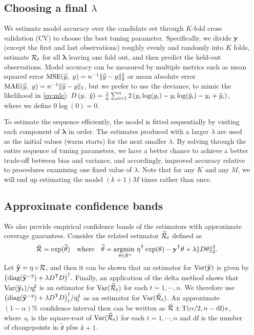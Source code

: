 \subsection{Choosing a final $\lambda$}
\label{sec:cv}

We estimate model accuracy over the candidate set through $K$-fold cross
validation (CV) to choose the best tuning parameter. Specifically, we divide
$\mathbf{y}$ (except the first and last observations) roughly evenly and randomly into
$K$ folds, estimate $\mathcal{R}_t$ for all $\boldsymbol{\lambda}$ leaving one fold
out, and then predict the held-out observations. Model accuracy can be measured
by multiple metrics such as mean squared error $\mathrm{MSE}(\widehat{y},\ y) =
n^{-1}\lVert \widehat{y} - y \rVert_2^2$ or mean absolute error
$\mathrm{MAE}(\widehat{y},\ y) = n^{-1}\lVert \widehat{y} - y \rVert_1$, but we prefer
to use the deviance, to mimic the likelihood in \autoref{eq:mle}: $D\left(y,\
\hat{y}\right) = \frac{1}{n} \sum_{i=1}^n 2\left(y_i \log(y_i) - y_i\log(\hat{y}_i) - y_i +
\hat{y}_i\right),$ where we define $0\log(0) = 0$. 

To estimate the sequence efficiently, the model is fitted sequentially by visiting each component 
of $\boldsymbol{\lambda}$ in order. The estimates produced with a larger 
$\lambda$ are used as the initial values (warm starts) for the next smaller $\lambda$. 
By solving through the entire sequence of tuning parameters, we have a better chance to 
achieve a better trade-off between bias and variance, and accordingly, improved
accuracy relative to procedures examining one fixed value of $\lambda$. Note
that for any $K$ and any $M$, we will end up estimating the model $(k+1)M$
times rather than once.


\subsection{Approximate confidence bands} 
\label{sec:conf-band} 

We also provide empirical confidence bands of the estimators with  
approximate coverage guarantees. 
Consider the related estimator $\widetilde{\mathcal{R}}_t$ defined as
$$\widetilde{\mathcal{R}} = \exp(\widetilde{\theta}) \quad\textrm{where}\quad
\widetilde{\theta} = \underset{\theta\in\mathbb{R}^n}{\operatorname*{argmin}\ } \eta^{\mathsf{T}} \exp(\theta) - \mathbf{y}^{\mathsf{T}}
\theta + \lambda \lVert D \theta \rVert_2^2.$$ 
Let $\widetilde{\mathbf{y}} = \eta \circ \mathcal{R}$, and then it can be shown \citep[for example,
Theorem 2 in][]{vaiter2017degrees} that an estimator for
$\mathrm{Var}(\widetilde{\mathbf{y}})$ is given by $\big(\mathrm{diag}(\widetilde{\mathbf{y}}^{-2})
+ \lambda D^{\mathsf{T}} D\big)^{\dagger}.$ Finally, an
application of the delta method shows that $\mathrm{Var}(\widetilde{\mathbf{y}}_t) / \eta_t^2$
is an estimator for $\mathrm{Var}(\widetilde{\mathcal{R}}_t)$ for each $t = 1, \cdots, n$. We
therefore use $\big(\mathrm{diag}(\widetilde{\mathbf{y}}^{-2}) + \lambda
D^{\mathsf{T}} D\big)^{\dagger}_t / \eta_t^2$ as an estimator
for $\mathrm{Var}(\widehat{\mathcal{R}}_t)$. An approximate $(1-\alpha)\%$ confidence interval
then can be written as $\widehat{\mathcal{R}} \pm \textrm{T}(\alpha/2, n-\textrm{df}) s$, where $s_t$ is
the square-root of $\mathrm{Var}(\widehat{\mathcal{R}}_t)$ for each $t = 1, \cdots, n$ and $\textrm{df}$ is
the number of changepoints in $\widetilde{\theta}$ plus $k+1$. 

